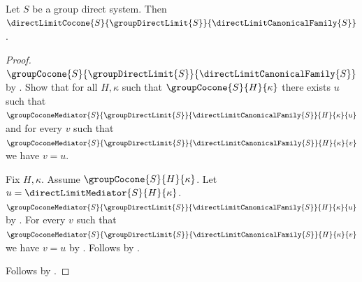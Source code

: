 \begin{theorem}\label{group_direct_limit_is_direct_limit_cocone}
    Let $S$ be a group direct system.
    Then $\directLimitCocone
        {S}{\groupDirectLimit{S}}{\directLimitCanonicalFamily{S}}$.
\end{theorem}
\begin{proof}
    $\groupCocone
        {S}{\groupDirectLimit{S}}{\directLimitCanonicalFamily{S}}$ by
        .
    Show that for all $H,\kappa$ such that
        $\groupCocone{S}{H}{\kappa}$ there exists $u$ such that
        $\groupCoconeMediator
            {S}{\groupDirectLimit{S}}{\directLimitCanonicalFamily{S}}
            {H}{\kappa}{u}$ and
        for every $v$ such that
            $\groupCoconeMediator
                {S}{\groupDirectLimit{S}}{\directLimitCanonicalFamily{S}}
                {H}{\kappa}{v}$
        we have $v=u$.
    \begin{subproof}
        Fix $H,\kappa$.
        Assume $\groupCocone{S}{H}{\kappa}$.
        Let $u=\directLimitMediator{S}{H}{\kappa}$.
        $\groupCoconeMediator
            {S}{\groupDirectLimit{S}}{\directLimitCanonicalFamily{S}}
            {H}{\kappa}{u}$ by
            .
        For every $v$ such that
            $\groupCoconeMediator
                {S}{\groupDirectLimit{S}}{\directLimitCanonicalFamily{S}}
                {H}{\kappa}{v}$
        we have $v=u$ by
            .
        Follows by \auto.
    \end{subproof}
    Follows by .
\end{proof}

